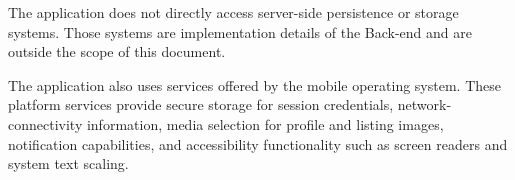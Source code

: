 The application does not directly access server-side persistence or storage systems.
Those systems are implementation details of the Back-end and are outside the scope of this document.

The application also uses services offered by the mobile operating system.
These platform services provide secure storage for session credentials, network-connectivity information, media selection for profile and listing images, notification capabilities, and accessibility functionality such as screen readers and system text scaling.
